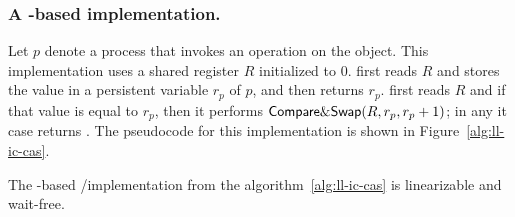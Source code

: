 \subsubsection{A \CAS-based implementation.}
Let $p$ denote a process that invokes an operation on the object. This implementation uses a shared register $R$ initialized to 0.  \LL first reads $R$ and stores the value in a persistent variable $r_p$ of $p$, and then returns $r_p$.  \IC first reads $R$ and if that value is equal to $r_p$, then it performs ${\sf Compare\&Swap}(R, r_p, r_p+1)$; in any it case returns \ok. The pseudocode for this implementation is shown in Figure~\ref{alg:ll-ic-cas}.

\begin{figure}[ht!]
\end{figure}

\begin{theorem}
\label{theorem:cas-ll-ic}
The \CAS-based \LL/\IC implementation from the algorithm~\ref{alg:ll-ic-cas} is linearizable and wait-free.
\end{theorem}

